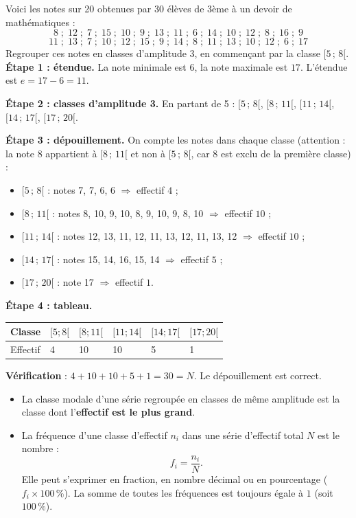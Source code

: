\documentclass[11pt]{article}
\newcommand{\cle}[1]{{\popxbold\color{popdark}#1}}
\begin{document}
\begin{exoresolu}
Voici les notes sur 20 obtenues par 30 élèves de 3ème à un devoir de mathématiques :
\[8\;;\;12\;;\;7\;;\;15\;;\;10\;;\;9\;;\;13\;;\;11\;;\;6\;;\;14\;;\;10\;;\;12\;;\;8\;;\;16\;;\;9\]
\[11\;;\;13\;;\;7\;;\;10\;;\;12\;;\;15\;;\;9\;;\;14\;;\;8\;;\;11\;;\;13\;;\;10\;;\;12\;;\;6\;;\;17\]
Regrouper ces notes en classes d'amplitude 3, en commençant par la classe $[5\,;\,8[$.
\tcblower
\textbf{Étape 1 : étendue.} La note minimale est $6$, la note maximale est $17$. L'étendue est $e = 17 - 6 = 11$.

\textbf{Étape 2 : classes d'amplitude 3.} En partant de 5 : $[5\,;\,8[$, $[8\,;\,11[$, $[11\,;\,14[$, $[14\,;\,17[$, $[17\,;\,20[$.

\textbf{Étape 3 : dépouillement.} On compte les notes dans chaque classe (attention : la note $8$ appartient à $[8\,;\,11[$ et non à $[5\,;\,8[$, car 8 est exclu de la première classe) :
\begin{itemize}
\item $[5\,;\,8[$ : notes 7, 7, 6, 6 $\Rightarrow$ effectif $4$ ;
\item $[8\,;\,11[$ : notes 8, 10, 9, 10, 8, 9, 10, 9, 8, 10 $\Rightarrow$ effectif $10$ ;
\item $[11\,;\,14[$ : notes 12, 13, 11, 12, 11, 13, 12, 11, 13, 12 $\Rightarrow$ effectif $10$ ;
\item $[14\,;\,17[$ : notes 15, 14, 16, 15, 14 $\Rightarrow$ effectif $5$ ;
\item $[17\,;\,20[$ : note 17 $\Rightarrow$ effectif $1$.
\end{itemize}

\textbf{Étape 4 : tableau.}
\begin{center}
\begin{tabularx}{\linewidth}{|l|X|X|X|X|X|}\hline
\rowcolor{popblueL} Classe & $[5;8[$ & $[8;11[$ & $[11;14[$ & $[14;17[$ & $[17;20[$ \\ \hline
Effectif & 4 & 10 & 10 & 5 & 1 \\ \hline
\end{tabularx}
\end{center}

\textbf{Vérification} : $4 + 10 + 10 + 5 + 1 = 30 = N$. Le dépouillement est correct.
\end{exoresolu}

\begin{definition}
\begin{itemize}
\item La \cle{classe modale} d'une série regroupée en classes de même amplitude est la classe dont l'\textbf{effectif est le plus grand}.
\item La \cle{fréquence} d'une classe d'effectif $n_i$ dans une série d'effectif total $N$ est le nombre :
\[f_i = \frac{n_i}{N}.\]
Elle peut s'exprimer en fraction, en nombre décimal ou en pourcentage ($f_i \times 100\,\%$). La somme de toutes les fréquences est toujours égale à $1$ (soit $100\,\%$).
\end{itemize}
\end{definition}
\end{document}
